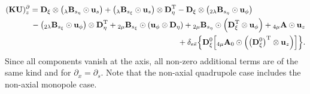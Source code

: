 \documentclass[11pt,letter,fleqn,english,notitlepage]{article}
\newcommand{\bu}{\mbox{${\bf u}$}} \newcommand{\bv}{\mbox{${\bf v}$}}
\newcommand{\bD}{\mbox{${\bf D}$}} \newcommand{\bU}{\mbox{${\bf U}$}}
\newcommand{\bK}{\mbox{${\bf K}$}} \newcommand{\bS}{\mbox{${\bf S}$}}
\newcommand{\bA}{\mbox{${\bf A}$}} \newcommand{\bQ}{\mbox{${\bf Q}$}}
\begin{document}
%
\begin{eqnarray}
\lefteqn{(\bK\bU)_z^{\partial} =
\bD_\xi\otimes\left({}_{\lambda}\bB_{s_\eta}\odot{\bu_s}\right)+
\left({}_{\lambda}\bB_{s_\xi}\odot{\bu_s}\right)\otimes\bD^{\rm{T}}_\eta-
\bD_\xi\otimes\left({}_{2\lambda}\bB_{s_\eta}\odot{\bu_\phi}\right)}
\nonumber\\&&\mbox{}\hspace{2.2em}
-\left({}_{2\lambda}\bB_{s_\xi}\odot{\bu_\phi}\right)\otimes\bD^{\rm{T}}_\eta
+{}_{2\mu}\bB_{s_\xi}\odot\left(\bu_\phi\otimes\bD_\eta\right)+
{}_{2\mu}\bB_{s_\eta}\odot\left(\bD^{\rm{T}}_\xi\otimes \bu_\phi\right)+
{}_{4\mu}\bA\odot \bu_z 
\nonumber\\&&\mbox{}\hspace{2.2em}
+\delta_{e\bar{e}}\Bigl\{
\bD^0_\xi\Bigl[{}_{4\mu}{\bA_0}\odot\left(\left(\bD^0_\xi\right)^{\rm{T}}\otimes 
\bu_z\right)\Bigr]\Bigr\}.
\end{eqnarray}
%
Since all components vanish at the axis, all non-zero additional terms are of 
the same kind and for $\partial_x=\partial_s$. 
Note that the non-axial quadrupole case includes the non-axial monopole case. 
%
\end{document}

